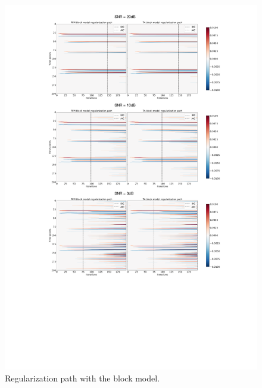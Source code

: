 \begin{figure}[t!]
    \begin{center}
        \includegraphics[]{figures/regpath_block.pdf}
    \end{center}
    \caption{Regularization path with the block model.}
\label{fig:path_block}
\end{figure}


